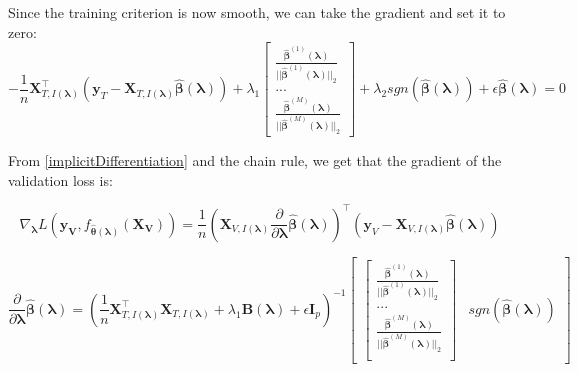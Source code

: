 \documentclass[10pt,letterpaper]{article}
\begin{document}
Since the training criterion is now smooth, we can take the gradient and set it to zero:
\begin{equation}
-\frac{1}{n} \boldsymbol{X}_{T, I(\boldsymbol\lambda)}^\top(\boldsymbol{y}_T - \boldsymbol{X}_{T, I(\boldsymbol\lambda)} \hat{\boldsymbol\beta}(\boldsymbol \lambda))
+ \lambda_1
\begin{bmatrix}
\frac{\hat{\boldsymbol{\beta}}^{(1)} (\boldsymbol \lambda)}{||\hat{\boldsymbol{\beta}}^{(1)} (\boldsymbol \lambda)||_2}\\
...\\
\frac{\hat{\boldsymbol\beta}^{(M)}(\boldsymbol \lambda)}{||\hat{\boldsymbol{\beta}}^{(M)} (\boldsymbol \lambda)||_2}
\end{bmatrix}
+ \lambda_2 sgn(\hat{\boldsymbol\beta}(\boldsymbol \lambda))
+ \epsilon \hat{\boldsymbol\beta}(\boldsymbol \lambda)
= 0
\end{equation}

From \eqref{implicitDifferentiation} and the chain rule, we get that the gradient of the validation loss is:

\begin{equation}
\nabla_{\boldsymbol \lambda} L(\boldsymbol{y_V}, f_{\hat{\boldsymbol{\theta}}(\boldsymbol{\lambda})}(\boldsymbol{X_V})) =
\frac{1}{n}
\left (
\boldsymbol{X}_{V, I(\boldsymbol\lambda)}
\frac{\partial}{\partial \boldsymbol\lambda} \hat{\boldsymbol{\beta}}(\boldsymbol{\lambda})
\right )^\top
\left (
\boldsymbol{y}_V - \boldsymbol{X}_{V, I(\boldsymbol\lambda)} \hat{\boldsymbol{\beta}}(\boldsymbol{\lambda})
\right )
\end{equation}

\begin{equation}
\frac{\partial}{\partial \boldsymbol \lambda} \hat{\boldsymbol{\beta}}(\boldsymbol{\lambda})
=
\left (
\frac{1}{n} \boldsymbol{X}_{T, I(\boldsymbol\lambda)}^\top \boldsymbol{X}_{T, I(\boldsymbol\lambda)}
+ \lambda_1 \boldsymbol{B}(\boldsymbol\lambda)
+ \epsilon \boldsymbol I_p
\right ) ^{-1}
\begin{bmatrix}
\begin{bmatrix}
\frac{\hat{\boldsymbol{\beta}}^{(1)}(\boldsymbol \lambda)}{||\hat{\boldsymbol{\beta}}^{(1)} (\boldsymbol \lambda)||_2}\\
...\\
\frac{\hat{\boldsymbol \beta}^{(M)} (\boldsymbol \lambda)}{||\hat{\boldsymbol{\beta}}^{(M)}(\boldsymbol \lambda)||_2}\\
\end{bmatrix}
&
sgn(\hat{\boldsymbol{\beta}}(\boldsymbol{\lambda}))
\end{bmatrix}
\end{equation}
\end{document}
